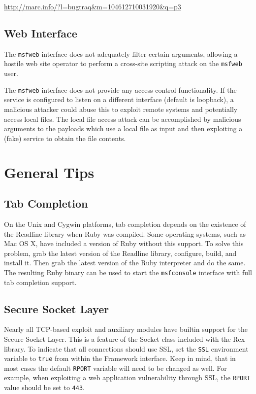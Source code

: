 \documentclass{report}
\begin{document}
\url{http://marc.info/?l=bugtraq&m=104612710031920&q=p3}


	\section{Web Interface}
\par
The \texttt{msfweb} interface does not adequately filter certain arguments,
allowing a hostile web site operator to perform a cross-site scripting
attack on the \texttt{msfweb} user.

\par
The \texttt{msfweb} interface does not provide any access control functionality. If
the service is configured to listen on a different interface (default is
loopback), a malicious attacker could abuse this to exploit remote systems
and potentially access local files. The local file access attack can be
accomplished by malicious arguments to the payloads which use a local file
as input and then exploiting a (fake) service to obtain the file contents.
	

\pagebreak
\chapter{General Tips}

	\section{Tab Completion}
	\label{REF-TAB}
\par
On the Unix and Cygwin platforms, tab completion depends on the existence of the Readline 
library when Ruby was compiled. Some operating systems, such as Mac OS X, have included
a version of Ruby without this support. To solve this problem, grab the latest version
of the Readline library, configure, build, and install it. Then grab the latest version
of the Ruby interpreter and do the same. The resulting Ruby binary can be used to start the
\texttt{msfconsole} interface with full tab completion support.


	\section{Secure Socket Layer}
	\label{REF-SSL}
\par
Nearly all TCP-based exploit and auxiliary modules have builtin support for the Secure Socket Layer.
This is a feature of the Socket class included with the Rex library. To indicate that all connections
should use SSL, set the \texttt{SSL} environment variable to \texttt{true} from within the Framework
interface. Keep in mind, that in most cases the default \texttt{RPORT} variable will need to be 
changed as well. For example, when exploiting a web application vulnerability through SSL, the
\texttt{RPORT} value should be set to \texttt{443}.
\end{document}
